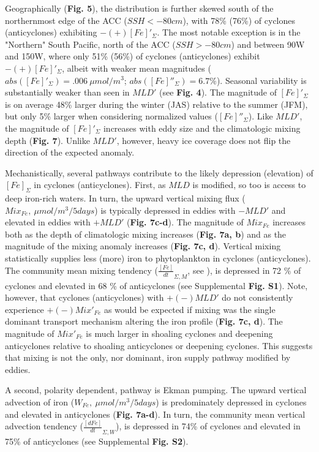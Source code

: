 Geographically (\textbf{Fig. 5}), the distribution is further skewed south of the northernmost edge of the ACC ($SSH<-80cm$), with 78\% (76\%) of cyclones (anticyclones) exhibiting $-(+)[Fe]'_\Sigma$. The most notable exception is in the "Northern" South Pacific, north of the ACC ($SSH>-80cm$) and between 90W and 150W, where only 51\% (56\%) of cyclones (anticyclones) exhibit $-(+)[Fe]'_\Sigma$, albeit with weaker mean magnitudes ($abs([Fe]'_\Sigma) = .006 \ \mu mol/m^3$; $abs([Fe]''_\Sigma) = 6.7\%$). Seasonal variability is substantially weaker than seen in $MLD'$ (see \textbf{Fig. 4}). The magnitude of $[Fe]'_\Sigma$ is on average 48\% larger during the winter (JAS) relative to the summer (JFM), but only 5\% larger when considering normalized values ($[Fe]''_\Sigma$). Like $MLD'$, the magnitude of $[Fe]'_\Sigma$ increases with eddy size and the climatologic mixing depth (\textbf{Fig. 7}). Unlike $MLD'$, however, heavy ice coverage does not flip the direction of the expected anomaly. 

Mechanistically, several pathways contribute to the likely depression (elevation) of $[Fe]_\Sigma$  in cyclones (anticyclones). First, as $MLD$ is modified, so too is access to deep iron-rich waters. In turn, the upward vertical mixing flux ($Mix_{Fe}, \ \mu mol/m^3/5 days$) is typically depressed in eddies with $-MLD'$ and elevated in eddies with $+MLD'$ (\textbf{Fig. 7c-d}). The magnitude of $Mix_{Fe}$ increases both as the depth of climatologic mixing increases (\textbf{Fig. 7a, b}) and as the magnitude of the mixing anomaly increases (\textbf{Fig. 7c, d}). Vertical mixing statistically supplies less (more) iron to phytoplankton in cyclones (anticyclones). The community mean mixing tendency ($\frac{[Fe]}{dt}_{\Sigma, M}$, see ), is depressed in 72 \% of cyclones and elevated in 68 \% of anticyclones (see Supplemental \textbf{Fig. S1}). Note, however, that cyclones (anticyclones) with $+(-)MLD'$ do not consistently experience $+(-)Mix'_{Fe}$ as would be expected if mixing was the single dominant transport mechanism altering the iron profile (\textbf{Fig. 7c, d}). The magnitude of $Mix'_{Fe}$ is much larger in shoaling cyclones and deepening anticyclones relative to shoaling anticyclones or deepening cyclones. This suggests that mixing is not the only, nor dominant, iron supply pathway modified by eddies. 

A second, polarity dependent, pathway is Ekman pumping. The upward vertical advection of iron ($W_{Fe},\ \mu mol/ m^3/5 days$) is predominately depressed in cyclones and elevated in anticyclones (\textbf{Fig. 7a-d}). In turn, the community mean vertical advection tendency ($\frac{[dFe]}{dt}_{\Sigma, W}$), is depressed in 74\% of cyclones and elevated in 75\% of anticyclones (see Supplemental \textbf{Fig. S2}). 

